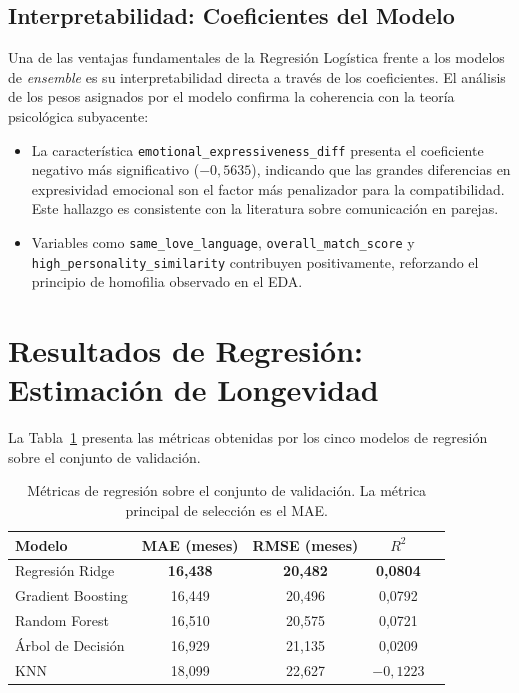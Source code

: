 \subsection{Interpretabilidad: Coeficientes del Modelo}

Una de las ventajas fundamentales de la Regresión Logística frente a los modelos de \textit{ensemble} es su interpretabilidad directa a través de los coeficientes. El análisis de los pesos asignados por el modelo confirma la coherencia con la teoría psicológica subyacente:

\begin{itemize}
    \item La característica \texttt{emotional\_expressiveness\_diff} presenta el coeficiente negativo más significativo ($-0,5635$), indicando que las grandes diferencias en expresividad emocional son el factor más penalizador para la compatibilidad. Este hallazgo es consistente con la literatura sobre comunicación en parejas.
    \item Variables como \texttt{same\_love\_language}, \texttt{overall\_match\_score} y \texttt{high\_personality\_similarity} contribuyen positivamente, reforzando el principio de homofilia observado en el EDA.
\end{itemize}

\section{Resultados de Regresión: Estimación de Longevidad}
\label{sec:resultados_regresion}

La Tabla~\ref{tab:resultados_regresion_val} presenta las métricas obtenidas por los cinco modelos de regresión sobre el conjunto de validación.

\begin{table}[H]
\centering
\begin{tabular}{lcccc}
\hline
\textbf{Modelo} & \textbf{MAE (meses)} & \textbf{RMSE (meses)} & \textbf{$R^2$} \\ \hline
Regresión Ridge     & \textbf{16,438} & \textbf{20,482} & \textbf{0,0804} \\
Gradient Boosting   & 16,449 & 20,496 & 0,0792 \\
Random Forest       & 16,510 & 20,575 & 0,0721 \\
Árbol de Decisión   & 16,929 & 21,135 & 0,0209 \\
KNN                 & 18,099 & 22,627 & $-0,1223$ \\ \hline
\end{tabular}
\caption{Métricas de regresión sobre el conjunto de validación. La métrica principal de selección es el MAE.}
\label{tab:resultados_regresion_val}
\end{table}

